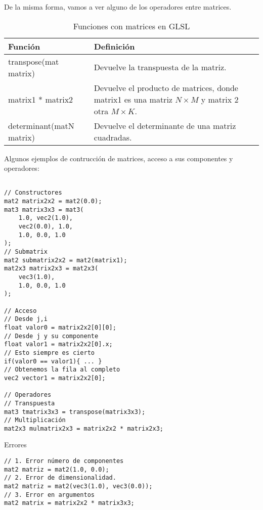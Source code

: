 De la misma forma, vamos a ver alguno de los operadores entre matrices.
\begin{table}[H]
    \begin{tabularx}{\textwidth}{l|X}
      \toprule
      Función & Definición\\
      \midrule
      transpose(mat matrix) & Devuelve la transpuesta de la matriz.\\
      matrix1 * matrix2 & Devuelve el producto de matrices, donde matrix1 es una matriz \(N\times M\) y matrix 2 otra \(M\times K\). \\
      determinant(matN matrix) & Devuelve el determinante de una matriz cuadradas. \\
      \bottomrule
    \end{tabularx}
    \caption{Funciones con matrices en GLSL \label{eq:matN}}
\end{table}
Algunos ejemplos de contrucción de matrices, acceso a sus componentes y operadores:
\begin{lstlisting}

// Constructores
mat2 matrix2x2 = mat2(0.0);
mat3 matrix3x3 = mat3(
    1.0, vec2(1.0),
    vec2(0.0), 1.0,
    1.0, 0.0, 1.0
);
// Submatrix
mat2 submatrix2x2 = mat2(matrix1);
mat2x3 matrix2x3 = mat2x3(
    vec3(1.0),
    1.0, 0.0, 1.0
);

// Acceso
// Desde j,i
float valor0 = matrix2x2[0][0];
// Desde j y su componente
float valor1 = matrix2x2[0].x;
// Esto siempre es cierto
if(valor0 == valor1){ ... }
// Obtenemos la fila al completo
vec2 vector1 = matrix2x2[0];

// Operadores
// Transpuesta
mat3 tmatrix3x3 = transpose(matrix3x3);
// Multiplicación
mat2x3 mulmatrix2x3 = matrix2x2 * matrix2x3;
\end{lstlisting}

Errores
\begin{lstlisting}
// 1. Error número de componentes
mat2 matriz = mat2(1.0, 0.0);
// 2. Error de dimensionalidad.
mat2 matriz = mat2(vec3(1.0), vec3(0.0));
// 3. Error en argumentos
mat2 matrix = matrix2x2 * matrix3x3;
\end{lstlisting}
